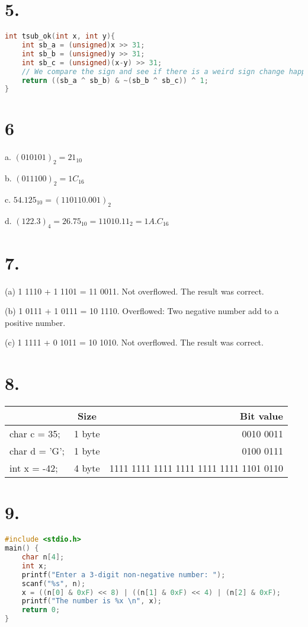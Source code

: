 \documentclass{article}
\begin{document}
\section*{5.}
\begin{lstlisting}[language=c]
int tsub_ok(int x, int y){
    int sb_a = (unsigned)x >> 31;
    int sb_b = (unsigned)y >> 31;
    int sb_c = (unsigned)(x-y) >> 31;
    // We compare the sign and see if there is a weird sign change happened.
    return ((sb_a ^ sb_b) & ~(sb_b ^ sb_c)) ^ 1;
}
\end{lstlisting}
\section*{6}
a. $(010101)_2 = 21_{10}$ 

b. $(011100)_2 = 1C_{16}$

c. $54.125_{10} = (110110.001)_2$

d. $(122.3)_4 = 26.75_{10} = 11010.11_2 = 1A.C_{16} $

\section*{7.}
    (a) 1 1110 + 1 1101 = 11 0011. Not overflowed. The result was correct.
    
    (b) 1 0111 + 1 0111 = 10 1110. Overflowed: Two negative number add to a positive number.
    
    (c) 1 1111 + 0 1011 = 10 1010. Not overflowed. The result was correct.

\section*{8.}
\begin{tabular}{l|c|r}
& Size & Bit value \\ \hline
char c = 35; & 1 byte & 0010 0011  \\
char d = 'G';& 1 byte & 0100 0111 \\
int x = -42; & 4 byte & 1111 1111 1111 1111 1111 1111 1101 0110
\end{tabular}
\section*{9.}
\begin{lstlisting}[language=c]
#include <stdio.h>
main() {
    char n[4];
    int x;
    printf("Enter a 3-digit non-negative number: ");
    scanf("%s", n);
    x = ((n[0] & 0xF) << 8) | ((n[1] & 0xF) << 4) | (n[2] & 0xF);
    printf("The number is %x \n", x);
    return 0;
}
\end{lstlisting}
\end{document}
